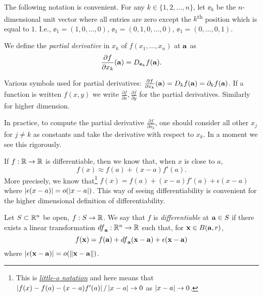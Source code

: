 The following notation is convenient.
For any \(k\in\{1,2,\ldots,n\}\),
let \(\ee_k\) be the \(n\)-dimensional unit vector where all entries are zero except the \(k\)\textsuperscript{th} position which is equal to \(1\).
I.e., \( \ee_1=(1,0,\ldots,0)  \),  \( \ee_1=(0,1,0,\ldots,0)  \),  \( \ee_1=(0,\ldots,0,1)  \).

\begin{definition}
    We define the \emph{partial derivative} in \(x_k\) of \(f(x_1,\ldots,x_n)\) at \(\aa\) as
    \[
        \frac{\partial f}{\partial x_k}(\aa) = D_{\ee_k}f(\aa).
    \]
\end{definition}


\begin{remark*}
    Various symbols used for partial derivatives:
    \(\frac{\partial f}{\partial x_k}(\aa) = D_kf(\aa) = \partial_{k}f(\aa)\).
    If  a function is written \(f(x,y)\) we write \(\frac{\partial f}{\partial x}, \frac{\partial f}{\partial y}\) for the partial derivatives. Similarly for higher dimension.
\end{remark*}

In practice, to compute the partial derivative \( \frac{\partial f}{\partial x_k}\), one should consider all other \(x_j\) for \(j\neq k\) as constants and take the derivative with respect to \(x_k\).
In a moment we see this rigorously.


If \(f:\bR \to \bR\) is differentiable, then we know that, when \(x\) is close to \(a\),
\[
    f(x) \approx f(a) + (x-a) f'(a).
\]
More precisely, we know that\footnote{This is \href{https://en.wikipedia.org/wiki/Big_O_notation\#Little-o_notation}{\emph{little-o notation}} and here means that \(\abs{f(x) - f(a) - (x-a) f'(a)}/\abs{x-a} \to 0\) as \(\abs{x-a}\to 0\).  } \(f(x) = f(a) + (x-a) f'(a) + \epsilon(x-a)\) where \(\abs{\epsilon(x-a)} = \littleo{\abs{x-a}}\).
This way of seeing differentiability is convenient for the higher dimensional definition of differentiability.

\begin{definition*}[differentiable]
    Let \(S\subset \bR^n\) be open, \(f:S \to \bR\).
    We say that \(f\) is \emph{differentiable} at \(\aa \in S\) if there exists a linear transformation \({df}_{\aa}: \bR^n \to \bR\) such that, for \(\xx \in B(\aa,r)\),
    \[
        f(\xx) = f(\aa) + {df}_{\aa}(\xx-\aa) + \epsilon(\xx-\aa)
    \]
    where \(\abs{\epsilon(\xx-\aa)} = \littleo{\norm{\xx-\aa}}\).
\end{definition*}


